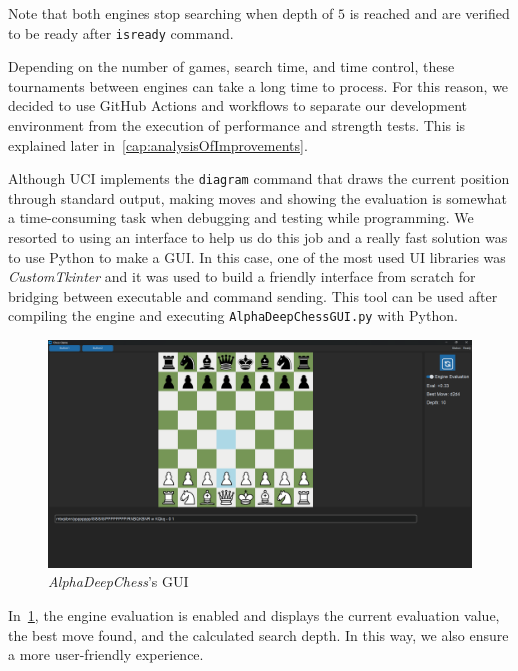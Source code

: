 \vspace{1em}

\noindent Note that both engines stop searching when depth of $5$ is reached and are verified to be ready after \texttt{isready} command.

\vspace{1em}

\noindent Depending on the number of games, search time, and time control, these tournaments between engines can take a long time to process. For this reason, we decided to use GitHub Actions and workflows to separate our development environment from the execution of performance and strength tests. This is explained later in~\cref{cap:analysisOfImprovements}.

\vspace{1em}

\noindent Although UCI implements the \texttt{diagram} command that draws the current position through standard output, making moves and showing the evaluation is somewhat a time-consuming task when debugging and testing while programming. We resorted to using an interface to help us do this job and a really fast solution was to use Python to make a GUI. In this case, one of the most used UI libraries was \textit{CustomTkinter} and it was used to build a friendly interface from scratch for bridging between executable and command sending. This tool can be used after compiling the engine and executing \texttt{AlphaDeepChessGUI.py} with Python.

\begin{figure}
    \centering
    \includegraphics[width=1.0\textwidth]{Imagenes/gui.png}
    \caption{\textit{AlphaDeepChess}'s GUI}\label{fig:gui}
\end{figure}

\noindent In~\cref{fig:gui}, the engine evaluation is enabled and displays the current evaluation value, the best move found, and the calculated search depth. In this way, we also ensure a more user-friendly experience.

